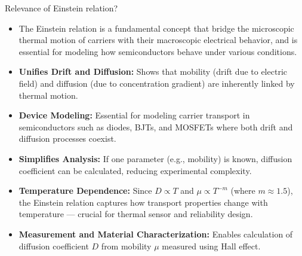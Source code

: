 \begin{frame}{Relevance of Einstein relation?}
    \begin{itemize}
        \item The Einstein relation is a fundamental concept that bridge the microscopic thermal motion of carriers with their macroscopic electrical behavior, and is essential for modeling how semiconductors behave under various conditions.
        \item \textbf{Unifies Drift and Diffusion:} Shows that mobility (drift due to electric field) and diffusion (due to concentration gradient) are inherently linked by thermal motion.
        \item \textbf{Device Modeling:} Essential for modeling carrier transport in semiconductors such as diodes, BJTs, and MOSFETs where both drift and diffusion processes coexist.
        \item \textbf{Simplifies Analysis:} If one parameter (e.g., mobility) is known, diffusion coefficient can be calculated, reducing experimental complexity.
        \item \textbf{Temperature Dependence:} Since $D \propto T$ and $\mu \propto T^{-m}$ (where $m \approx 1.5$), the Einstein relation captures how transport properties change with temperature — crucial for thermal sensor and reliability design.
        \item \textbf{Measurement and Material Characterization:} Enables calculation of diffusion coefficient $D$ from mobility $\mu$ measured using Hall effect.
    \end{itemize}
\end{frame}

